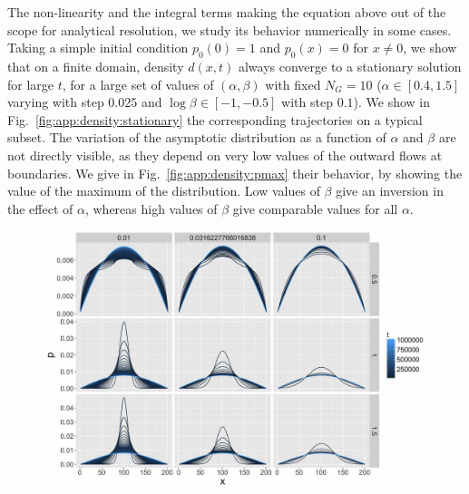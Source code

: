 The non-linearity and the integral terms making the equation above out of the scope for analytical resolution, we study its behavior numerically in some cases. Taking a simple initial condition $p_0(0)=1$ and $p_0(x)=0$ for $x\neq 0$, we show that on a finite domain, density $d(x,t)$ always converge to a stationary solution for large $t$, for a large set of values of $(\alpha,\beta)$ with fixed $N_G=10$ ($\alpha\in \left[0.4,1.5\right]$ varying with step $0.025$ and $\log\beta \in \left[-1,-0.5\right]$ with step $0.1$). We show in Fig.~\ref{fig:app:density:stationary} the corresponding trajectories on a typical subset. The variation of the asymptotic distribution as a function of $\alpha$ and $\beta$ are not directly visible, as they depend on very low values of the outward flows at boundaries. We give in Fig.~\ref{fig:app:density:pmax} their behavior, by showing the value of the maximum of the distribution. Low values of $\beta$ give an inversion in the effect of $\alpha$, whereas high values of $\beta$ give comparable values for all $\alpha$.




\begin{figure}[h!]
\includegraphics[width=\textwidth]{Figures/Final/A-density-stationary.jpg}
\end{figure}



